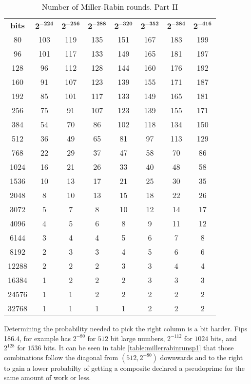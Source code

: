 \documentclass[synpaper]{book}
\begin{document}
\newpage
\begin{table}[h]
\begin{center}
\begin{tabular}{c c c c c c c c}
\textbf{bits} &$\mathbf{2^{-224}}$ & $\mathbf{2^{-256}}$ & $\mathbf{2^{-288}}$ & $\mathbf{2^{-320}}$ & $\mathbf{2^{-352}}$ & $\mathbf{2^{-384}}$ & $\mathbf{2^{-416}}$\\
80    & 103 & 119 & 135 & 151 & 167 & 183 & 199 \\
96    & 101 & 117 & 133 & 149 & 165 & 181 & 197 \\
128   & 96  & 112 & 128 & 144 & 160 & 176 & 192 \\
160   & 91  & 107 & 123 & 139 & 155 & 171 & 187 \\
192   & 85  & 101 & 117 & 133 & 149 & 165 & 181 \\
256   & 75  & 91  & 107 & 123 & 139 & 155 & 171 \\
384   & 54  & 70  & 86  & 102 & 118 & 134 & 150 \\
512   & 36  & 49  & 65  & 81  & 97  & 113 & 129 \\
768   & 22  & 29  & 37  & 47  & 58  & 70  & 86  \\
1024  & 16  & 21  & 26  & 33  & 40  & 48  & 58  \\
1536  & 10  & 13  & 17  & 21  & 25  & 30  & 35  \\
2048  & 8   & 10  & 13  & 15  & 18  & 22  & 26  \\
3072  & 5   & 7   & 8	& 10  & 12  & 14  & 17  \\
4096  & 4   & 5   & 6	& 8   & 9   & 11  & 12  \\
6144  & 3   & 4   & 4	& 5   & 6   & 7   & 8	\\
8192  & 2   & 3   & 3	& 4   & 5   & 6   & 6	\\
12288 & 2   & 2   & 2	& 3   & 3   & 4   & 4	\\
16384 & 1   & 2   & 2	& 2   & 3   & 3   & 3	\\
24576 & 1   & 1   & 2	& 2   & 2   & 2   & 2	\\
32768 & 1   & 1   & 1	& 1   & 2   & 2   & 2
\end{tabular}
\caption{ Number of Miller-Rabin rounds. Part II } \label{table:millerrabinrunsp2}
\end{center}
\end{table}

Determining the probability needed to pick the right column is a bit harder. Fips 186.4, for example has $2^{-80}$ for $512$ bit large numbers, $2^{-112}$ for $1024$ bits, and $2^{128}$ for $1536$ bits. It can be seen in table \ref{table:millerrabinrunsp1} that those combinations follow the diagonal from $(512,2^{-80})$ downwards and to the right to gain a lower probabilty of getting a composite declared a pseudoprime for the same amount of work or less.
\end{document}
